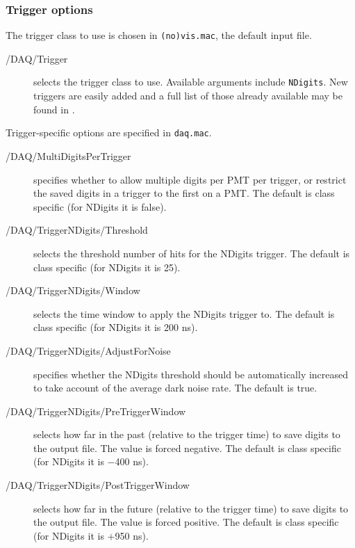 \subsubsection{Trigger options}
The trigger class to use is chosen in \texttt{(no)vis.mac}, the default input file.
\begin{description}
\item[/DAQ/Trigger] selects the trigger class to use. Available arguments include \texttt{NDigits}. New triggers are easily added and a full list of those already available may be found in .
\end{description}
Trigger-specific options are specified in \texttt{daq.mac}.
\begin{description}

\item[/DAQ/MultiDigitsPerTrigger] specifies whether to allow multiple digits per PMT per trigger, or restrict the saved digits in a trigger to the first on a PMT. The default is class specific (for NDigits it is false).

\item[/DAQ/TriggerNDigits/Threshold] selects the threshold number of hits for the NDigits trigger. The default is class specific (for NDigits it is 25).
\item[/DAQ/TriggerNDigits/Window] selects the time window to apply the NDigits trigger to. The default is class specific (for NDigits it is 200 ns).
\item[/DAQ/TriggerNDigits/AdjustForNoise] specifies whether the NDigits threshold should be automatically increased to take account of the average dark noise rate. The default is true.
\item[/DAQ/TriggerNDigits/PreTriggerWindow] selects how far in the past (relative to the trigger time) to save digits to the output file. The value is forced negative. The default is class specific (for NDigits it is $-$400 ns). 
\item[/DAQ/TriggerNDigits/PostTriggerWindow] selects how far in the future (relative to the trigger time) to save digits to the output file. The value is forced positive. The default is class specific (for NDigits it is $+$950 ns). 


\end{description}
